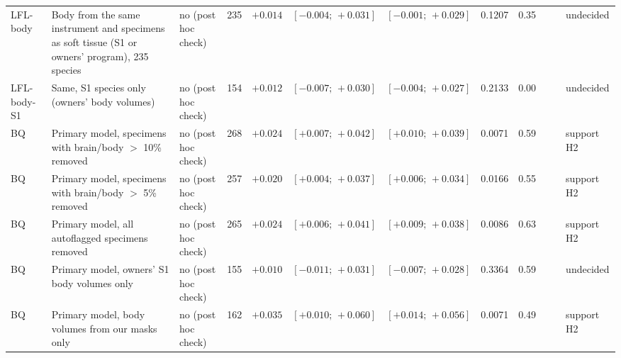 \begin{table}
\begin{tabular}{@{}l>{\raggedright\arraybackslash}p{9.0cm}>{\raggedright\arraybackslash}p{1.9cm}rrccrrrrl@{}}
LFL-body & Body from the same instrument and specimens as soft tissue (S1 or owners' program), 235 species & no (post hoc check) & 235 & $+0.014$ & $[-0.004;\,+0.031]$ & $[-0.001;\,+0.029]$ & 0.1207 & 0.35 &  &  & undecided \\
LFL-body-S1 & Same, S1 species only (owners' body volumes) & no (post hoc check) & 154 & $+0.012$ & $[-0.007;\,+0.030]$ & $[-0.004;\,+0.027]$ & 0.2133 & 0.00 &  &  & undecided \\
\midrule
BQ & Primary model, specimens with brain/body $>$ 10\% removed & no (post hoc check) & 268 & $+0.024$ & $[+0.007;\,+0.042]$ & $[+0.010;\,+0.039]$ & 0.0071 & 0.59 &  &  & support H2 \\
BQ & Primary model, specimens with brain/body $>$ 5\% removed & no (post hoc check) & 257 & $+0.020$ & $[+0.004;\,+0.037]$ & $[+0.006;\,+0.034]$ & 0.0166 & 0.55 &  &  & support H2 \\
BQ & Primary model, all autoflagged specimens removed & no (post hoc check) & 265 & $+0.024$ & $[+0.006;\,+0.041]$ & $[+0.009;\,+0.038]$ & 0.0086 & 0.63 &  &  & support H2 \\
BQ & Primary model, owners' S1 body volumes only & no (post hoc check) & 155 & $+0.010$ & $[-0.011;\,+0.031]$ & $[-0.007;\,+0.028]$ & 0.3364 & 0.59 &  &  & undecided \\
BQ & Primary model, body volumes from our masks only & no (post hoc check) & 162 & $+0.035$ & $[+0.010;\,+0.060]$ & $[+0.014;\,+0.056]$ & 0.0071 & 0.49 &  &  & support H2 \\
\bottomrule
\end{tabular}
\end{table}
